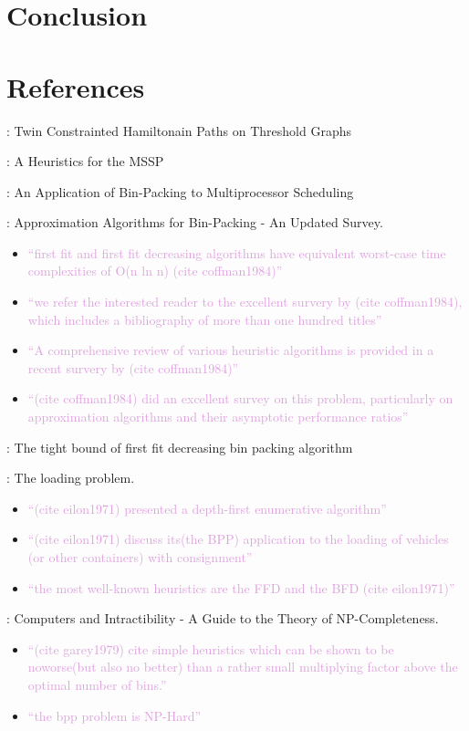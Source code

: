 \documentclass[oribibl]{llncs}
\begin{document}
\section{Conclusion}
\label{sec:conclusion}

\section{References}
\cite{becker2010}: Twin Constrainted Hamiltonain Paths on Threshold Graphs 

\cite{becker2015}: A Heuristics for the MSSP

\cite{coffman1978}: An Application of Bin-Packing to Multiprocessor Scheduling

\cite{coffman1984}: Approximation Algorithms for Bin-Packing - An Updated Survey.
\begin{itemize}
	\item \textcolor{Plum}{``first fit and first fit decreasing algorithms have equivalent worst-case time complexities of O(n ln n) (cite coffman1984)''}
	\item \textcolor{Plum}{``we refer the interested reader to the excellent survery by (cite coffman1984), which includes a bibliography of more than one hundred titles''}
	\item \textcolor{Plum}{``A comprehensive review of various heuristic algorithms is provided in a recent survery by (cite coffman1984)''}
	\item \textcolor{Plum}{``(cite coffman1984) did an excellent survey on this problem, particularly on approximation algorithms and their asymptotic performance ratios''}
\end{itemize}

\cite{dosa2007}: The tight bound of first fit decreasing bin packing algorithm

\cite{eilon1971}: The loading problem. 
\begin{itemize}
	\item \textcolor{Plum}{``(cite eilon1971) presented a depth-first enumerative algorithm''}
	\item \textcolor{Plum}{``(cite eilon1971) discuss its(the BPP) application to the loading of vehicles (or other containers) with consignment''}
	\item \textcolor{Plum}{``the most well-known heuristics are the FFD and the BFD (cite eilon1971)''}
\end{itemize}

\cite{garey1979}: Computers and Intractibility - A Guide to the Theory of NP-Completeness. 
\begin{itemize}
	\item \textcolor{Plum}{``(cite garey1979) cite simple heuristics which can be shown to be noworse(but also no better) than a rather small multiplying factor above the optimal number of bins.''}
	\item \textcolor{Plum}{``the bpp problem is NP-Hard''}
\end{itemize}
\end{document}
